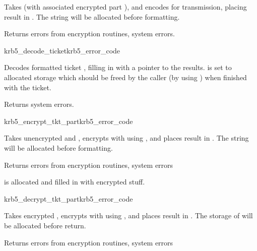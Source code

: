 Takes  (with associated encrypted part
),
and encodes for transmission, placing result in .
The string  will be allocated before formatting.

Returns errors from encryption routines, system errors.

\begin{funcdecl}{krb5_decode_ticket}{krb5_error_code}{\funcin}
\funcout
{}
\end{funcdecl}

Decodes formatted ticket ,
filling in  with a pointer to the results.
 is set to allocated storage which should be
freed by the caller (by using ) when finished with
the ticket.

Returns system errors.


\begin{funcdecl}{krb5_encrypt_tkt_part}{krb5_error_code}{ \funcin}
\funcinout
{}
\end{funcdecl}

Takes unencrypted  and
, encrypts with
using , and places result in
.
The string  will be allocated
before formatting.

Returns errors from encryption routines, system errors

 is allocated and filled in with
encrypted stuff.

\begin{funcdecl}{krb5_decrypt_tkt_part}{krb5_error_code}{\funcin}
\funcinout
{}
\end{funcdecl}

Takes encrypted , encrypts with
using , and places result in
.  The storage of
 will be allocated before return.

Returns errors from encryption routines, system errors


